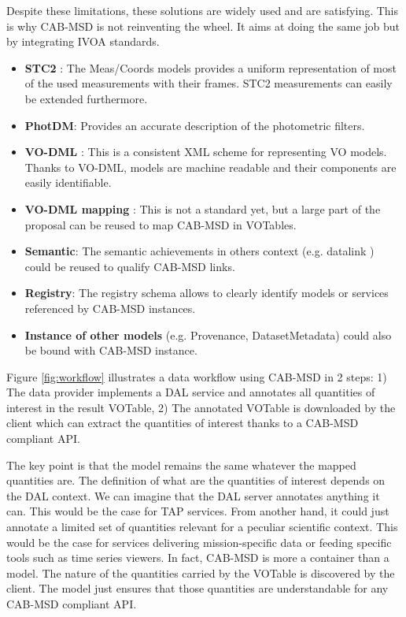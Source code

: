 \documentclass[11pt,a4paper]{ivoa}
\begin{document}
Despite these limitations, these solutions are widely used and are satisfying. This is why CAB-MSD is not reinventing the wheel. It aims at doing the same job but by integrating IVOA standards.

\begin{itemize}
    \item \textbf{STC2} \citep{wiki:stc2}: The Meas/Coords models provides a uniform representation of most of the used measurements with their frames. STC2 measurements can easily be extended furthermore.
    \item \textbf{PhotDM}\citep{2013ivoa.spec.1005s}: Provides an accurate description of the photometric filters.
    \item \textbf{VO-DML} \citep{2018ivoa.spec.0910L}: This is a consistent XML scheme for representing VO models. Thanks to VO-DML, models are machine readable and their components are easily identifiable.
    \item \textbf{VO-DML mapping} \citep{wd:wdmapping}: This is not a standard yet, but a large part of the proposal can be reused to map CAB-MSD in VOTables. 
    \item \textbf{Semantic}: The semantic achievements in others context (e.g. datalink \cite{std:DataLink}) could be reused to qualify  CAB-MSD links.
    \item \textbf{Registry}: The registry schema allows to clearly identify models or services referenced by CAB-MSD instances.
    \item \textbf{Instance of other models} (e.g. Provenance, DatasetMetadata) could also be bound with CAB-MSD instance.
\end{itemize}

Figure \ref{fig:workflow} illustrates a data workflow using CAB-MSD in 2 steps: 1) The data provider implements a DAL service and annotates all quantities of interest in the result VOTable, 2)  The annotated VOTable is downloaded by the client which can extract the quantities of interest thanks to a CAB-MSD compliant API.


The key point is that the  model remains the same whatever the mapped quantities are. The definition of what are the quantities of interest depends on the DAL context. We can imagine that the DAL server annotates anything it can. This would be the case for TAP services. From another hand, it could just annotate a limited set of quantities relevant for a peculiar scientific context. This would be the case for services delivering mission-specific data or feeding specific tools such as time series viewers.
In fact, CAB-MSD is more a container than a model. The nature of the quantities carried by the VOTable is discovered by the client. The model just ensures that those quantities are understandable for any CAB-MSD compliant API.
\end{document}
